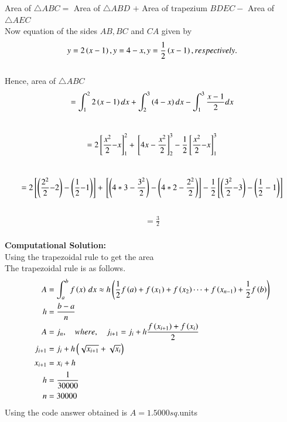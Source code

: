 \documentclass[journal]{IEEEtran}
\begin{document}
   Area  of $\triangle ABC = $ Area of $\triangle ABD$ $+ $  Area of trapezium $BDEC - $ Area of $\triangle AEC$ \\
   Now equation of the sides $AB,BC$ and $CA$ given by\\
 \begin{align}
     y=2\left(x-1\right),y=4-x,y=\frac{1}{2}\left(x-1\right),respectively.
 \end{align}\\
 Hence,   area of $\triangle ABC$
 \begin{align}
     =\int_{1}^{2}2\left(x-1\right){dx} + \int_{2}^{3}\left(4-x\right){dx} - \int_{1}^{3}\frac{x-1}{2}{dx}
 \end{align}\\
 \begin{align}
     =2{}\left[\frac{x^{2}}{2}{-x}\right]_{1}^{2} +{}\left[{4x}-\frac{x^{2}}{2}\right]_{2}^{3} - \frac{1}{2}{}\left[\frac{x^{2}}{2}{-x}\right]_{1}^{3}
 \end{align}\\
 \begin{align}
     =2{}\left[\left(\frac{2^{2}}{2}{-2}\right)-\left(\frac{1}{2}{-1}\right)\right] + {}\left[\left(4 * 3 - \frac{3^{2}}{2}\right) - \left(4 * 2 - \frac{2^{2}}{2}\right)\right] - \frac{1}{2} {}\left[\left(\frac{3^{2}}{2}{-3}\right) - \left(\frac{1}{2} -1\right)\right]
 \end{align}\\
 \begin{align}
     =\frac{3}{2}
 \end{align}\\
 \textbf{Computational Solution:}\\
Using the trapezoidal rule to get the area\\
The trapezoidal rule is as follows.\\
\begin{align}
    A &= \int_a^b f\left(x\right)\,dx\approx h\left(\frac{1}{2}f\left(a\right)+f\left(x_1\right)+f\left(x_2\right)\dots+f\left(x_{n-1}\right)+\frac{1}{2}f\left(b\right)\right)\\
    h&=\frac{b-a}{n}\\
    A &= j_n,\quad where ,\quad j_{i+1}=j_i +h\frac{f\left(x_{i+1}\right)+f\left(x_i\right)}{2}\\
    j_{i+1}&= j_i+h\left(\sqrt{x_{i+1}}+\sqrt{x_i}\right)\\
    x_{i+1}&=x_i +h\\
    h&=\frac{1}{30000}\\
    n&=30000
\end{align}
Using the code answer obtained is $A=1.5000sq$.units \\
\end{document}
